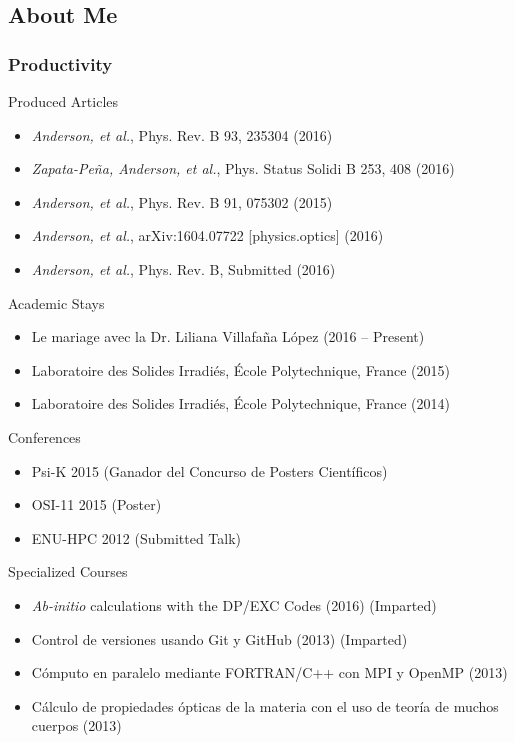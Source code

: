 \documentclass{beamer}
\begin{document}

\subsection{About Me}

\begin{frame}
\frametitle{Productivity}
\begin{block}{Produced Articles}
\begin{itemize}
\small
\item \emph{Anderson, et al.}, Phys. Rev. B 93, 235304 (2016)
\item \emph{Zapata-Pe\~na, Anderson, et al.}, Phys. Status Solidi B 253, 408 (2016) %
\item \emph{Anderson, et al.}, Phys. Rev. B 91, 075302 (2015)
\item \emph{Anderson, et al.}, arXiv:1604.07722 [physics.optics] (2016)
\item \emph{Anderson, et al.}, Phys. Rev. B, Submitted (2016)
\end{itemize}
\end{block}
\begin{block}{Academic Stays}
\begin{itemize}
\small
\item Le mariage avec la Dr. Liliana Villafa\~na L\'opez (2016 -- Present)
\item Laboratoire des Solides Irradi\'es, \'Ecole Polytechnique, France (2015)
\item Laboratoire des Solides Irradi\'es, \'Ecole Polytechnique, France (2014)
\end{itemize}
\end{block}
\end{frame}

\begin{frame}
\begin{block}{Conferences}
\begin{itemize}
\item Psi-K 2015 (Ganador del Concurso de Posters Cient\'ificos)
\item OSI-11 2015 (Poster)
\item ENU-HPC 2012 (Submitted Talk)
\end{itemize}
\end{block}
\begin{block}{Specialized Courses}
\begin{itemize}
\item \emph{Ab-initio} calculations with the DP/EXC Codes (2016) (Imparted)
\item Control de versiones usando Git y GitHub (2013) (Imparted)
\item C\'omputo en paralelo mediante FORTRAN/C++ con MPI y OpenMP (2013)
\item C\'alculo de propiedades \'opticas de la materia con el uso de teor\'ia de muchos cuerpos (2013)
\end{itemize}
\end{block}
\end{frame}
\end{document}
